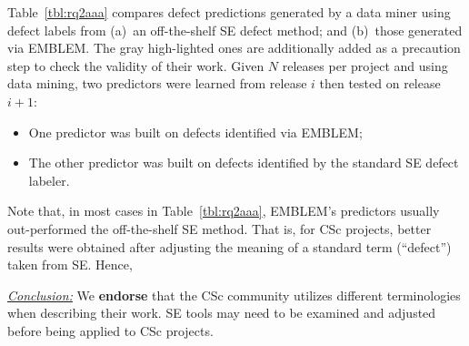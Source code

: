 \documentclass[conference,10pt]{IEEEtran}
\newcommand{\bi}{\begin{itemize}}
\newcommand{\ei}{\end{itemize}}
\newenvironment{RQ}{\vspace{1mm}\begin{tcolorbox}[enhanced,width=3.4in,size=fbox,colback=red!5!white,drop shadow southeast,sharp corners]}{\end{tcolorbox}}
\begin{document}
Table~\ref{tbl:rq2aaa} 
compares defect predictions generated by a data
miner using defect labels from (a)~an off-the-shelf SE defect method;
and (b)~those generated via EMBLEM. The gray high-lighted ones are additionally added as a precaution step to check the validity of their work. 
Given $N$ releases per project and using data mining, two predictors were learned from release $i$ then tested on release $i+1$:
\bi
\item
One predictor was built on defects identified  via EMBLEM;
\item
The other predictor was built on defects identified by the standard SE defect labeler.
\ei


Note that, in most cases in  Table~\ref{tbl:rq2aaa},  EMBLEM's predictors usually out-performed the off-the-shelf SE method. 
That is, for CSc projects,
better results were obtained after adjusting the meaning of a standard term (``defect'')
taken from SE. Hence, 

\begin{RQ}
\textit{\underline{Conclusion:}} We \textbf{endorse} that the CSc community utilizes different terminologies when describing their work. SE tools
may need to be examined and adjusted before being applied to CSc projects.
\end{RQ}




\end{document}
